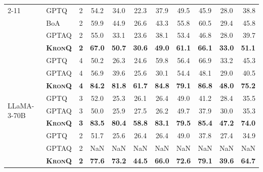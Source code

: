 \documentclass{article} %
\newcommand{\KronQ}{\textsc{KronQ}}
\begin{document}
\begin{longtable}{l||l|c|cccccccr}
\cline{2-11}
 & GPTQ  & 2 & 54.2 & 34.0 & 22.3 & 37.9 & 49.5 & 45.9 & 28.0 & 38.8 \\
 & BoA   & 2 & 59.9 & 44.9 & 26.6 & 43.3 & 55.8 & 60.5 & 29.4 & 45.8 \\
 & GPTAQ & 2 & 55.0 & 33.1 & 23.6 & 38.1 & 53.4 & 46.8 & 28.0 & 39.7 \\
 & \cellcolor{gray!15}\textbf{\KronQ} & \cellcolor{gray!15}\textbf{2} & \cellcolor{gray!15}\textbf{67.0} & \cellcolor{gray!15}\textbf{50.7} & \cellcolor{gray!15}\textbf{30.6} & \cellcolor{gray!15}\textbf{49.0} & \cellcolor{gray!15}\textbf{61.1} & \cellcolor{gray!15}\textbf{66.1} & \cellcolor{gray!15}\textbf{33.0} & \cellcolor{gray!15}\textbf{51.1} \\
\hline
\multirow{9}{*}{LLaMA-3-70B}
 & GPTQ  & 4 & 50.2 & 26.3 & 24.6 & 59.8 & 56.4 & 66.9 & 33.2 & 45.3 \\
 & GPTAQ & 4 & 56.9 & 39.6 & 25.6 & 30.1 & 54.4 & 48.1 & 29.0 & 40.5 \\
 & \cellcolor{gray!15}\textbf{\KronQ} & \cellcolor{gray!15}\textbf{4} & \cellcolor{gray!15}\textbf{84.2} & \cellcolor{gray!15}\textbf{81.8} & \cellcolor{gray!15}\textbf{61.7} & \cellcolor{gray!15}\textbf{84.8} & \cellcolor{gray!15}\textbf{79.1} & \cellcolor{gray!15}\textbf{86.8} & \cellcolor{gray!15}\textbf{48.0} & \cellcolor{gray!15}\textbf{75.2} \\
\cline{2-11}
 & GPTQ  & 3 & 52.0 & 25.3 & 26.1 & 26.4 & 49.0 & 41.2 & 28.4 & 35.5 \\
 & GPTAQ & 3 & 50.0 & 25.9 & 27.5 & 26.2 & 49.7 & 37.9 & 30.0 & 35.3 \\
 & \cellcolor{gray!15}\textbf{\KronQ} & \cellcolor{gray!15}\textbf{3} & \cellcolor{gray!15}\textbf{83.5} & \cellcolor{gray!15}\textbf{80.4} & \cellcolor{gray!15}\textbf{58.8} & \cellcolor{gray!15}\textbf{83.1} & \cellcolor{gray!15}\textbf{79.5} & \cellcolor{gray!15}\textbf{85.4} & \cellcolor{gray!15}\textbf{47.2} & \cellcolor{gray!15}\textbf{74.0} \\
\cline{2-11}
 & GPTQ  & 2 & 51.7 & 25.6 & 26.4 & 26.4 & 49.0 & 37.8 & 27.4 & 34.9 \\
 & GPTAQ & 2 & NaN & NaN & NaN & NaN & NaN & NaN & NaN & NaN \\
 & \cellcolor{gray!15}\textbf{\KronQ} & \cellcolor{gray!15}\textbf{2} & \cellcolor{gray!15}\textbf{77.6} & \cellcolor{gray!15}\textbf{73.2} & \cellcolor{gray!15}\textbf{44.5} & \cellcolor{gray!15}\textbf{66.0} & \cellcolor{gray!15}\textbf{72.6} & \cellcolor{gray!15}\textbf{79.1} & \cellcolor{gray!15}\textbf{39.6} & \cellcolor{gray!15}\textbf{64.7} \\
\hline
\end{longtable}
\vspace{-10mm}
\endgroup
\end{document}

